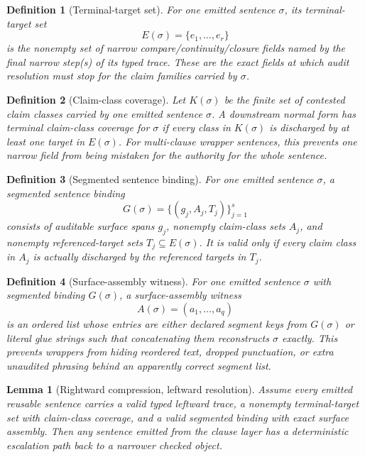 \documentclass[11pt]{article}
\newtheorem{definition}{Definition}
\newtheorem{lemma}{Lemma}
\begin{document}
\begin{definition}[Terminal-target set]
For one emitted sentence $\sigma$, its \emph{terminal-target set}
\[
E(\sigma)=\{e_1,\dots,e_r\}
\]
is the nonempty set of narrow compare/continuity/closure fields named by the final \textsf{narrow} step(s) of its typed trace.
These are the exact fields at which audit resolution must stop for the claim families carried by $\sigma$.
\end{definition}

\begin{definition}[Claim-class coverage]
Let $K(\sigma)$ be the finite set of contested claim classes carried by one emitted sentence $\sigma$.
A downstream normal form has \emph{terminal claim-class coverage} for $\sigma$ if every class in $K(\sigma)$ is discharged by at least one target in $E(\sigma)$.
For multi-clause wrapper sentences, this prevents one narrow field from being mistaken for the authority for the whole sentence.
\end{definition}

\begin{definition}[Segmented sentence binding]
For one emitted sentence $\sigma$, a \emph{segmented sentence binding}
\[
G(\sigma)=\{(g_j,A_j,T_j)\}_{j=1}^s
\]
consists of auditable surface spans $g_j$, nonempty claim-class sets $A_j$, and nonempty referenced-target sets $T_j\subseteq E(\sigma)$.
It is valid only if every claim class in $A_j$ is actually discharged by the referenced targets in $T_j$.
\end{definition}

\begin{definition}[Surface-assembly witness]
For one emitted sentence $\sigma$ with segmented binding $G(\sigma)$, a \emph{surface-assembly witness}
\[
A(\sigma)=(a_1,\dots,a_q)
\]
is an ordered list whose entries are either declared segment keys from $G(\sigma)$ or literal glue strings such that concatenating them reconstructs $\sigma$ exactly.
This prevents wrappers from hiding reordered text, dropped punctuation, or extra unaudited phrasing behind an apparently correct segment list.
\end{definition}

\begin{lemma}[Rightward compression, leftward resolution]
Assume every emitted reusable sentence carries a valid typed leftward trace, a nonempty terminal-target set with claim-class coverage, and a valid segmented binding with exact surface assembly.
Then any sentence emitted from the clause layer has a deterministic escalation path back to a narrower checked object.
\end{lemma}
\end{document}
